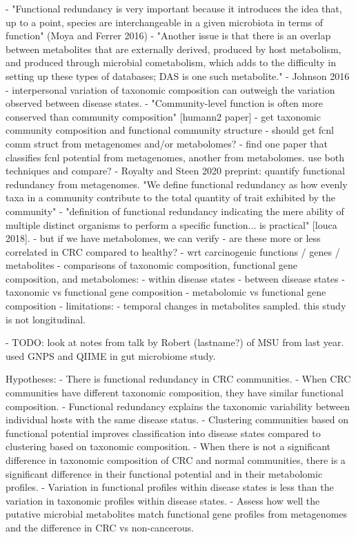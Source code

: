 \documentclass[12pt]{article}
\begin{document}
- "Functional redundancy is very important because it introduces the idea that, up to a point, species are interchangeable in a given microbiota in terms of function" (Moya and Ferrer 2016)
- "Another issue is that there is an overlap between metabolites that are externally derived, produced by host metabolism, and produced through microbial cometabolism, which adds to the difficulty in setting up these types of databases; DAS is one such metabolite." - Johnson 2016
- interpersonal variation of taxonomic composition can outweigh the variation observed between disease states.
    - "Community-level function is often more conserved than community composition" [humann2 paper]
- get taxonomic community composition and functional community structure
    - should get fcnl comm struct from metagenomes and/or metabolomes?
        - find one paper that classifies fcnl potential from metagenomes, another from metabolomes. use both techniques and compare?
        - Royalty and Steen 2020 preprint: quantify functional redundancy from metagenomes. "We define functional redundancy as how evenly taxa in a community contribute to the total quantity of trait exhibited by the community"
    - "definition of functional redundancy indicating the mere ability of multiple distinct organisms to perform a specific function... is practical" [louca 2018].
        - but if we have metabolomes, we can verify
    - are these more or less correlated in CRC compared to healthy?
        - wrt carcinogenic functions / genes / metabolites
- comparisons of taxonomic composition, functional gene composition, and metabolomes:
    - within disease states
    - between disease states
        - taxonomic vs functional gene composition
        - metabolomic vs functional gene composition
- limitations:
    - temporal changes in metabolites sampled. this study is not longitudinal.

- TODO: look at notes from talk by Robert (lastname?) of MSU from last year. used GNPS and QIIME in gut microbiome study.

Hypotheses:
- There is functional redundancy in CRC communities.
    - When CRC communities have different taxonomic composition, they have similar functional composition.
        - Functional redundancy explains the taxonomic variability between individual hosts with the same disease status.
- Clustering communities based on functional potential improves classification into disease states compared to clustering based on taxonomic composition.
- When there is not a significant difference in taxonomic composition of CRC and normal communities, there is a significant difference in their functional potential and in their metabolomic profiles.
- Variation in functional profiles within disease states is less than the variation in taxonomic profiles within disease states.
- Assess how well the putative microbial metabolites match functional gene profiles from metagenomes and the difference in CRC vs non-cancerous.
\end{document}
